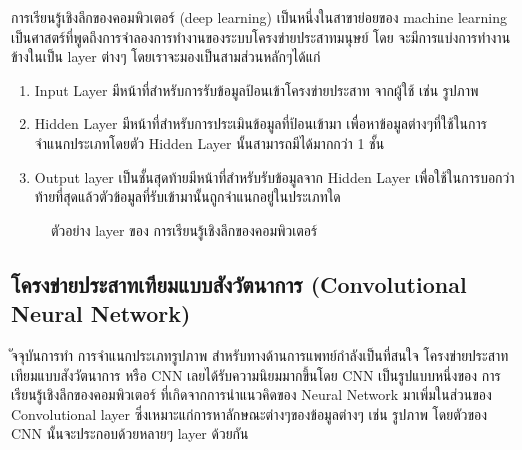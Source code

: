 \documentclass[12pt,oneside,openright,a4paper]{cpe-thai-project}
\begin{document}
\par การเรียนรู้เชิงลึกของคอมพิวเตอร์ (deep learning) เป็นหนึ่งในสาขาย่อยของ machine learning เป็นศาสตร์ที่พูดถึงการจำลองการทำงานของระบบโครงข่ายประสาทมนุษย์ โดย จะมีการแบ่งการทำงานข้างในเป็น layer ต่างๆ โดยเราจะมองเป็นสามส่วนหลักๆได้แก่ 	

\begin{enumerate}
  \item Input Layer มีหน้าที่สำหรับการรับข้อมูลป้อนเข้าโครงข่ายประสาท จากผู้ใช้ เช่น รูปภาพ
  \item Hidden Layer มีหน้าที่สำหรับการประเมินข้อมูลที่ป้อนเข้ามา เพื่อหาข้อมูลต่างๆที่ใช้ในการจำแนกประเภทโดยตัว Hidden Layer นั้นสามารถมีได้มากกว่า 1 ชั้น
  \item Output layer เป็นชั้นสุดท้ายมีหน้าที่สำหรับรับข้อมูลจาก Hidden Layer เพื่อใช้ในการบอกว่าท้ายที่สุดแล้วตัวข้อมูลที่รับเข้ามานั้นถูกจำแนกอยู่ในประเภทใด
\end{enumerate}

\begin{figure}[!ht]\centering
  \setlength{\fboxrule}{0.2mm} %
  \setlength{\fboxsep}{1cm}
  \caption{ตัวอย่าง layer ของ การเรียนรู้เชิงลึกของคอมพิวเตอร์}\label{fig:deep}
\end{figure}

\subsection{โครงข่ายประสาทเทียมแบบสังวัตนาการ (Convolutional Neural Network)\cite{CS231}} 
ัจจุบันการทำ การจำแนกประเภทรูปภาพ สำหรับทางด้านการแพทย์กำลังเป็นที่สนใจ โครงข่ายประสาทเทียมแบบสังวัตนาการ 
หรือ CNN เลยได้รับความนิยมมากขึ้นโดย CNN เป็นรูปแบบหนึ่งของ การเรียนรู้เชิงลึกของคอมพิวเตอร์ ที่เกิดจากการนำแนวคิดของ  
Neural Network มาเพิ่มในส่วนของ Convolutional layer ซึ่งเหมาะแก่การหาลักษณะต่างๆของข้อมูลต่างๆ เช่น รูปภาพ 
โดยตัวของ CNN นั้นจะประกอบด้วยหลายๆ layer ด้วยกัน
\end{document}
